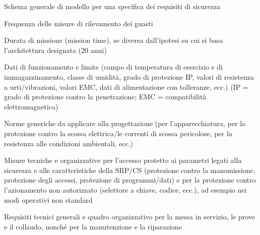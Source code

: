\begin{riquadro}[label=box:06-1]{Schema generale di modello per una specifica dei requisiti di sicurezza}
\begin{description}[font=\normalfont, align=left, leftmargin=1.3cm, labelwidth=1.1cm, labelsep=0.2cm, itemsep=0pt, parsep=0pt, topsep=0pt]
    \item[5.9.3] Frequenza delle misure di rilevamento dei guasti
    \item[5.9.4] Durata di missione (mission time), se diversa dall'ipotesi su cui si basa l'architettura designata (20 anni)
    \item[5.10] Dati di funzionamento e limite (campo di temperatura di esercizio e di immagazzinamento, classe di umidità, grado di protezione IP, valori di resistenza a urti/vibrazioni, valori EMC, dati di alimentazione con tolleranze, ecc.) (IP = grado di protezione contro la penetrazione; EMC = compatibilità elettromagnetica)
    \item[5.11] Norme generiche da applicare alla progettazione (per l'apparecchiatura, per la protezione contro la scossa elettrica/le correnti di scossa pericolose, per la resistenza alle condizioni ambientali, ecc.)
    \item[5.12] Misure tecniche e organizzative per l'accesso protetto ai parametri legati alla sicurezza e alle caratteristiche della SRP/CS (protezione contro la manomissione, protezione degli accessi, protezione di programmi/dati) e per la protezione contro l'azionamento non autorizzato (selettore a chiave, codice, ecc.), ad esempio nei modi operativi non standard
    \item[5.13] Requisiti tecnici generali e quadro organizzativo per la messa in servizio, le prove e il collaudo, nonché per la manutenzione e la riparazione
\end{description}
\end{riquadro}


